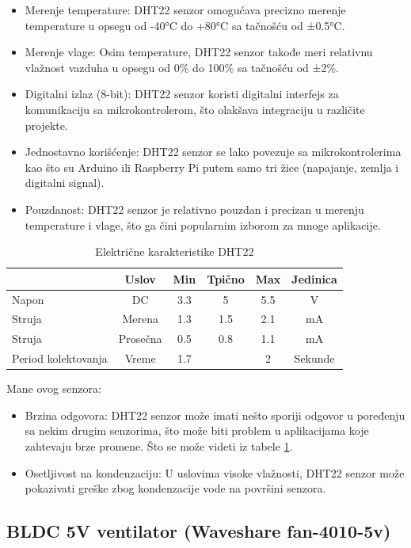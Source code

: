 \documentclass[a4paper, 12pt]{article}
\begin{document}
\begin{itemize}
	\item Merenje temperature: DHT22 senzor omogućava precizno merenje temperature u opsegu od -40°C do +80°C sa tačnošću od ±0.5°C.
	\item Merenje vlage: Osim temperature, DHT22 senzor takođe meri relativnu vlažnost vazduha u opsegu od 0\% do 100\% sa tačnošću od ±2\%.
	\sloppypar
	\item Digitalni izlaz (8-bit): DHT22 senzor koristi digitalni interfejs za komunikaciju sa mikrokontrolerom, što olakšava integraciju u različite projekte.
	\item Jednostavno korišćenje: DHT22 senzor se lako povezuje sa mikrokontrolerima kao što su Arduino ili Raspberry Pi putem samo tri žice (napajanje, zemlja i digitalni signal).
	\item Pouzdanost: DHT22 senzor je relativno pouzdan i precizan u merenju temperature i vlage, što ga čini popularnim izborom za mnoge aplikacije.
\end{itemize}

\begin{table}[H]
\centering
\begin{tabular}{|l|c|c|c|c|c|}
\hline
& Uslov & Min & Tpično & Max & Jedinica\\
\hline
Napon & DC & 3.3 & 5 & 5.5 & V\\
\hline
Struja & Merena & 1.3 & 1.5 & 2.1 & mA\\
\hline
Struja & Prosečna & 0.5 & 0.8 & 1.1 & mA\\
\hline
Period kolektovanja & Vreme & 1.7 &  & 2 & Sekunde\\
\hline
\end{tabular}
\caption{Električne karakteristike DHT22} \label{tab:DHT22}
\end{table}

Mane ovog senzora: 
\begin{itemize}
\item Brzina odgovora: DHT22 senzor može imati nešto sporiji odgovor u poređenju sa nekim drugim senzorima, što može biti problem u aplikacijama koje zahtevaju brze promene. Što se može videti iz tabele \ref{tab:DHT22}.
\item Osetljivost na kondenzaciju: U uslovima visoke vlažnosti, DHT22 senzor može pokazivati greške zbog kondenzacije vode na površini senzora.
\end{itemize}

\pagebreak

	\subsection{BLDC 5V ventilator (Waveshare fan-4010-5v)}
	
\end{document}
